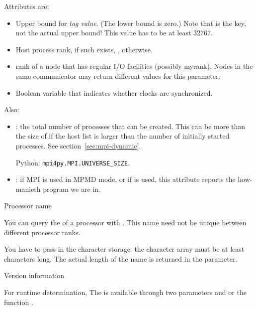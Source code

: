 
Attributes are:
\begin{itemize}
\item {}
  Upper bound for \emph{tag value}.
  (The lower bound is zero.)
  Note that  is the key, not the actual upper bound!
  This value has to be at least 32767.
\item {}
  Host process rank, if such exists, , otherwise.
\item {}
rank of a node that has regular I/O facilities (possibly
myrank). Nodes in the same communicator may return different values
for this parameter.
\item {}
Boolean variable that indicates whether clocks are synchronized.
\end{itemize}

Also:
\begin{itemize}
\item {}: the total number of processes
  that can be created. This can be more than the size of
   if the host list is larger than the number of
  initially started processes. See section~\ref{sec:mpi-dynamic}.

  Python: \lstinline{mpi4py.MPI.UNIVERSE_SIZE}.
\item {}: if MPI is used in \ac{MPMD} mode, or
  if  is used, this attribute
  reports the how-manieth program we are in.
\end{itemize}

 {Processor name}

You can query the  of a processor with
.
This name need not be unique between different processor ranks.

You have to pass in the character storage:
the character array must be at least  characters long.
The actual length of the name is returned in the  parameter.

 {Version information}

For runtime determination,
The  is available through two parameters
 and 
or the function .

